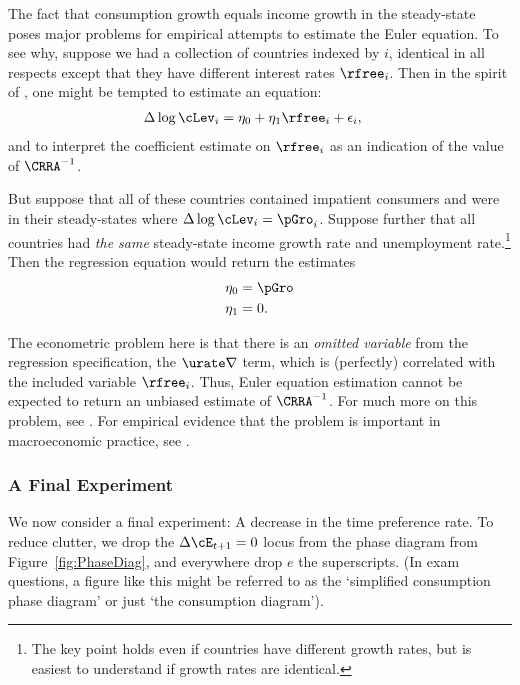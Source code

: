 \documentclass{\handout}
\begin{document}
The fact that consumption growth equals income growth in the
steady-state poses major problems for empirical attempts to estimate
the Euler equation.  To see why, suppose we had a collection of
countries indexed by $i$, identical in all respects except that
they have different interest rates $\rfree_{i}$.
Then in the spirit of \cite{hallSubstitution}, one might be
tempted to estimate an equation:
\begin{equation}\begin{gathered}\begin{aligned}
        \Delta \log \cLev_{i} & =  \eta_{0} + \eta_{1} \rfree_{i}+\epsilon_{i},
\end{aligned}\end{gathered}\end{equation}
and to interpret the coefficient estimate on $\rfree_{i}$ as an indication
of the value of $\CRRA^{-1}$.

But suppose that all of these countries contained impatient consumers
and were in their steady-states where $\Delta \log \cLev_{i} = \pGro_{i}$.
Suppose further
that all countries had {\it the same} steady-state income growth rate and
unemployment rate.\footnote{The key point holds even if countries have different
growth rates, but is easiest to understand if growth rates are identical.}
Then the regression equation would return the estimates
\begin{equation}\begin{gathered}\begin{aligned}
        \eta_{0} & =  \pGro  \\
        \eta_{1} & =  0.
\end{aligned}\end{gathered}\end{equation}

The econometric problem here is that there is an {\it omitted
variable} from the regression specification, the $\urate \nabla$ term, which is (perfectly) correlated with the included
variable $\rfree_{i}$.  Thus, Euler equation estimation cannot be expected to
return an unbiased estimate of $\CRRA^{-1}$.  For much more on this
problem, see \cite{carroll:death}.  For empirical evidence
that the problem is important in macroeconomic practice, see \cite{ParkerPrestonPrecaution}.

\subsubsection{A Final Experiment}
We now consider a final experiment: A decrease in the time preference
rate.  To reduce clutter, we drop the $\Delta \cE_{t+1}=0$ locus from the 
phase diagram from Figure~\ref{fig:PhaseDiag}, and everywhere drop $e$ the superscripts.  
(In exam questions, a figure like this might be referred to as the `simplified consumption phase diagram' or just
`the consumption diagram').
\end{document}
